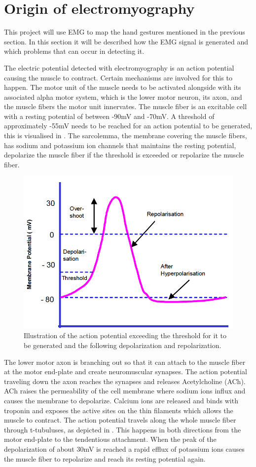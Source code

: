 \section{Origin of electromyography}
This project will use EMG to map the hand gestures mentioned in the previous section. In this section it will be described how the EMG signal is generated and which problems that can occur in detecting it. 

The electric potential detected with electromyography is an action potential causing the muscle to contract. Certain mechanisms are involved for this to happen. The motor unit of the muscle needs to be activated alongside with its associated alpha motor system, which is the lower motor neuron, its axon, and the muscle fibers the motor unit innervates. The muscle fiber is an excitable cell with a resting potential of between -90mV and -70mV. A threshold of approximately -55mV needs to be reached for an action potential to be generated, this is visualised in . The sarcolemma, the membrane covering the muscle fibers, has sodium and potassium ion channels that maintains the resting potential, depolarize the muscle fiber if the threshold is exceeded or repolarize the muscle fiber. \cite{cram2012}


\begin{figure}[H]
	\includegraphics[width=.4\textwidth]{figures/Anatomy/action_potential}  %
	\caption{Illustration of the action potential exceeding the threshold for it to be generated and the following depolarization and repolarization. \cite{konrad2005}}
	\label{fig:action_potential}  %
\end{figure}

The lower motor axon is branching out so that it can attach to the muscle fiber at the motor end-plate and create neuromuscular synapses. The action potential traveling down the axon reaches the synapses and releases Acetylcholine (ACh). ACh raises the permeability of the cell membrane where sodium ions influx and causes the membrane to depolarize. Calcium ions are released and binds with troponin and exposes the active sites on the thin filaments which allows the muscle to contract. The action potential travels along the whole muscle fiber through t-tubuluses, as depicted in . This happens in both directions from the motor end-plate to the tendentious attachment. When the peak of the depolarization of about 30mV is reached a rapid efflux of potassium ions causes the muscle fiber to repolarize and reach its resting potential again. \cite{cram2012}


